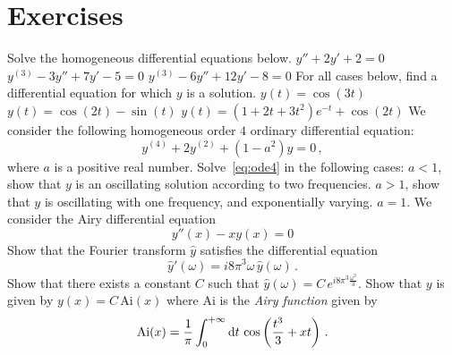 \section{Exercises}
\begin{ExerciseList}
  \Exercise[label=ode-hom]
  Solve the homogeneous differential equations below.
  \Question $y''+2y'+2=0$
  \Question $y^{(3)}-3y''+7y'-5=0$
  \Question $y^{(3)}-6y''+12y'-8=0$
  \Exercise[label=ode-rev]
  For all cases below, find a differential equation for which $y$ is a solution.
  \Question $y(t)=\cos(3t)$
  \Question $y(t)=\cos(2t)-\sin(t)$
  \Question $y(t)=(1+2t+3t^2)e^{-t}+\cos(2t)$
  \Exercise[label=ode4]
  We consider the following homogeneous order $4$ ordinary differential equation:
  \begin{equation}
    y^{(4)}+2y^{(2)}+(1-a^2)y=0\,,
    \label{eq:ode4}
  \end{equation}
  where $a$ is a positive real number.
  \Question Solve~\cref{eq:ode4} in the following cases:
  \subQuestion $a<1$, show that $y$ is an oscillating solution according to two frequencies.
  \subQuestion $a>1$, show that $y$ is oscillating with one frequency, and exponentially varying.
  \subQuestion $a=1$.
  \Exercise[label=airy]
  We consider the Airy differential equation
  \begin{equation}
    y''(x)-xy(x)=0
  \end{equation}
  \Question Show that the Fourier transform $\hat{y}$ satisfies the differential equation
  \begin{equation}
    \hat{y}'(\omega)=i8\pi^3\omega\,\hat{y}(\omega)\,.
  \end{equation}
  \Question Show that there exists a constant $C$ such that $\hat{y}(\omega)=C\,e^{i8\pi^3\frac{\omega^3}{3}}$.
  \Question Show that $y$ is given by $y(x)=C\,\mathrm{Ai}(x)$
  where $\mathrm{Ai}$ is the \emph{Airy function} given by
  \begin{equation}
    \mathrm{Ai}(x)=\frac{1}{\pi}\int_{0}^{+\infty}\mathrm{d} t\,\cos\left(\frac{t^3}{3}+xt\right)\,.
  \end{equation}

\end{ExerciseList}
